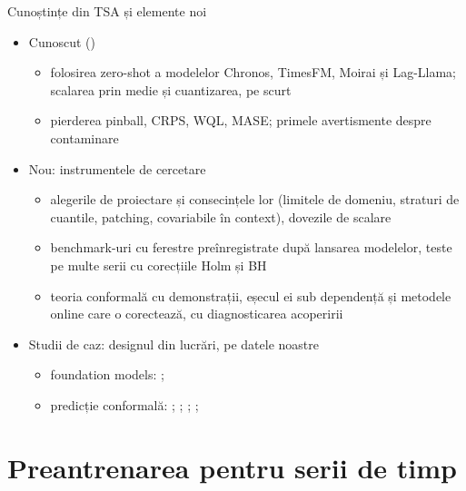\begin{frame}{Cunoștințe din TSA și elemente noi}
\itemsize{\small}
\begin{itemize}
    \item \hypertarget{c13known}{}Cunoscut ()
    \begin{itemize}
        \item folosirea zero-shot a modelelor Chronos, TimesFM, Moirai și Lag-Llama; scalarea prin medie și cuantizarea, pe scurt
        \item pierderea pinball, CRPS, WQL, MASE; primele avertismente despre contaminare
    \end{itemize}
    \item Nou: instrumentele de cercetare
    \begin{itemize}
        \item alegerile de proiectare și consecințele lor (limitele de domeniu, straturi de cuantile, patching, covariabile în context), dovezile de scalare
        \item benchmark-uri cu ferestre preînregistrate după lansarea modelelor, teste pe multe serii cu corecțiile Holm și BH
        \item teoria conformală cu demonstrații, eșecul ei sub dependență și metodele online care o corectează, cu diagnosticarea acoperirii
    \end{itemize}
    \item Studii de caz: designul din lucrări, pe datele noastre
    \begin{itemize}
        \item foundation models: ; 
        \item predicție conformală: ; ; ; ; 
    \end{itemize}
\end{itemize}
\end{frame}


\section{Preantrenarea pentru serii de timp}

